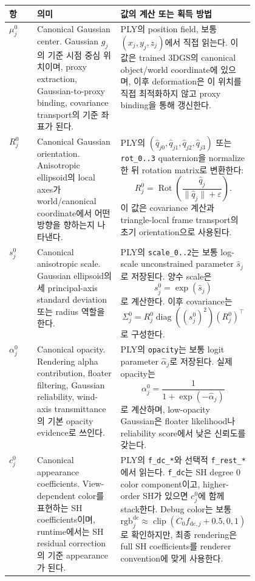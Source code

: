 \documentclass[11pt,a4paper]{article}
\newcommand{\eps}{\varepsilon}
\begin{document}
\begin{center}
\small
\begin{tabularx}{0.98\linewidth}{L{0.12\linewidth}L{0.35\linewidth}Y}
\toprule
항 & 의미 & 값의 계산 또는 획득 방법 \\
\midrule
$\mu_j^0$ &
Canonical Gaussian center. Gaussian $g_j$의 기준 시점 중심 위치이며, proxy extraction, Gaussian-to-proxy binding, covariance transport의 기준 좌표가 된다. &
PLY의 position field, 보통 $(x_j,y_j,z_j)$에서 직접 읽는다. 이 값은 trained 3DGS의 canonical object/world coordinate에 있으며, 이후 deformation은 이 위치를 직접 최적화하지 않고 proxy binding을 통해 갱신한다. \\
\addlinespace
$R_j^0$ &
Canonical Gaussian orientation. Anisotropic ellipsoid의 local axes가 world/canonical coordinate에서 어떤 방향을 향하는지 나타낸다. &
PLY의 $(\hat q_{j0},\hat q_{j1},\hat q_{j2},\hat q_{j3})$ 또는 \texttt{rot\_0..3} quaternion을 normalize한 뒤 rotation matrix로 변환한다:
\[
R_j^0=\operatorname{Rot}\left(\frac{\hat q_j}{\|\hat q_j\|+\eps}\right).
\]
이 값은 covariance 계산과 triangle-local frame transport의 초기 orientation으로 사용된다. \\
\addlinespace
$s_j^0$ &
Canonical anisotropic scale. Gaussian ellipsoid의 세 principal-axis standard deviation 또는 radius 역할을 한다. &
PLY의 \texttt{scale\_0..2}는 보통 log-scale unconstrained parameter $\hat s_j$로 저장된다. 양수 scale은
\[
s_j^0=\exp(\hat s_j)
\]
로 계산한다. 이후 covariance는
\[
\Sigma_j^0=R_j^0\operatorname{diag}((s_j^0)^2)(R_j^0)^\top
\]
로 구성한다. \\
\addlinespace
$\alpha_j^0$ &
Canonical opacity. Rendering alpha contribution, floater filtering, Gaussian reliability, wind-axis transmittance의 기본 opacity evidence로 쓰인다. &
PLY의 \texttt{opacity}는 보통 logit parameter $\hat\alpha_j$로 저장된다. 실제 opacity는
\[
\alpha_j^0=\frac{1}{1+\exp(-\hat\alpha_j)}
\]
로 계산하며, low-opacity Gaussian은 floater likelihood나 reliability score에서 낮은 신뢰도를 갖는다. \\
\addlinespace
$c_j^0$ &
Canonical appearance coefficients. View-dependent color를 표현하는 SH coefficients이며, runtime에서는 SH residual correction의 기준 appearance가 된다. &
PLY의 \texttt{f\_dc\_*}와 선택적 \texttt{f\_rest\_*}에서 읽는다. \texttt{f\_dc}는 SH degree 0 color component이고, higher-order SH가 있으면 $c_j^0$에 함께 stack한다. Debug color는 보통
\[
\mathrm{rgb}_{j}^{\mathrm{dc}}\approx \operatorname{clip}(C_0 f_{\mathrm{dc},j}+0.5,0,1)
\]
로 확인하지만, 최종 rendering은 full SH coefficients를 renderer convention에 맞게 사용한다. \\
\bottomrule
\end{tabularx}
\normalsize
\end{center}
\end{document}
